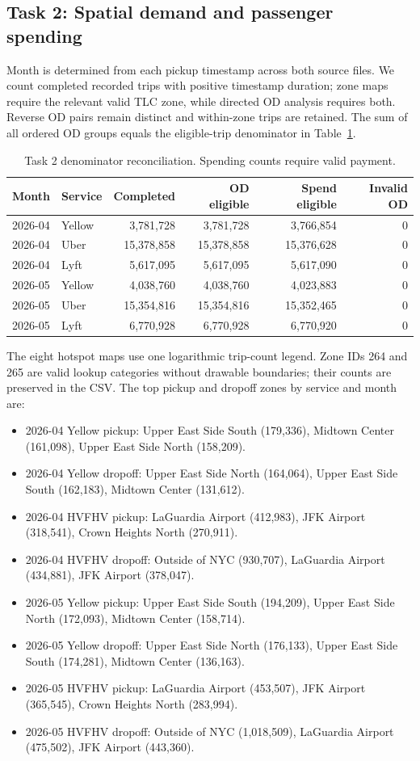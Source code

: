 \subsection{Task 2: Spatial demand and passenger spending}
Month is determined from each pickup timestamp across both source files. We count completed recorded trips with positive timestamp duration; zone maps require the relevant valid TLC zone, while directed OD analysis requires both. Reverse OD pairs remain distinct and within-zone trips are retained. The sum of all ordered OD groups equals the eligible-trip denominator in Table~\ref{tab:t2rec}.
\begin{table}[htbp]\centering\small
\caption{Task 2 denominator reconciliation. Spending counts require valid payment.}\label{tab:t2rec}
\begin{tabular}{llrrrr}\hline Month & Service & Completed & OD eligible & Spend eligible & Invalid OD \\ \hline
2026-04 & Yellow & 3,781,728 & 3,781,728 & 3,766,854 & 0 \\
2026-04 & Uber & 15,378,858 & 15,378,858 & 15,376,628 & 0 \\
2026-04 & Lyft & 5,617,095 & 5,617,095 & 5,617,090 & 0 \\
2026-05 & Yellow & 4,038,760 & 4,038,760 & 4,023,883 & 0 \\
2026-05 & Uber & 15,354,816 & 15,354,816 & 15,352,465 & 0 \\
2026-05 & Lyft & 6,770,928 & 6,770,928 & 6,770,920 & 0 \\
\hline\end{tabular}\end{table}
The eight hotspot maps use one logarithmic trip-count legend. Zone IDs 264 and 265 are valid lookup categories without drawable boundaries; their counts are preserved in the CSV. The top pickup and dropoff zones by service and month are:
\begin{itemize}
\item 2026-04 Yellow pickup: Upper East Side South (179,336), Midtown Center (161,098), Upper East Side North (158,209).
\item 2026-04 Yellow dropoff: Upper East Side North (164,064), Upper East Side South (162,183), Midtown Center (131,612).
\item 2026-04 HVFHV pickup: LaGuardia Airport (412,983), JFK Airport (318,541), Crown Heights North (270,911).
\item 2026-04 HVFHV dropoff: Outside of NYC (930,707), LaGuardia Airport (434,881), JFK Airport (378,047).
\item 2026-05 Yellow pickup: Upper East Side South (194,209), Upper East Side North (172,093), Midtown Center (158,714).
\item 2026-05 Yellow dropoff: Upper East Side North (176,133), Upper East Side South (174,281), Midtown Center (136,163).
\item 2026-05 HVFHV pickup: LaGuardia Airport (453,507), JFK Airport (365,545), Crown Heights North (283,994).
\item 2026-05 HVFHV dropoff: Outside of NYC (1,018,509), LaGuardia Airport (475,502), JFK Airport (443,360).
\end{itemize}
